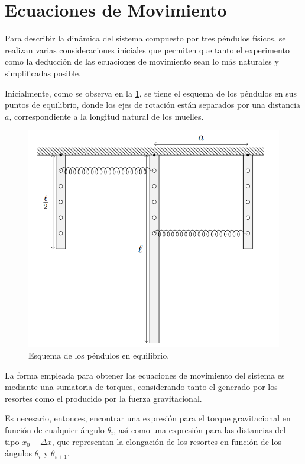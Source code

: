 \section{Ecuaciones de Movimiento}

Para describir la dinámica del sistema compuesto por tres péndulos físicos, se realizan varias consideraciones iniciales que permiten que tanto el experimento como la deducción de las ecuaciones de movimiento sean lo más naturales y simplificadas posible.

Inicialmente, como se observa en la \cref{fig:esquema_equilibrio}, se tiene el esquema de los péndulos en sus puntos de equilibrio, donde los ejes de rotación están separados por una distancia \( a \), correspondiente a la longitud natural de los muelles.

\begin{figure}[h]
    \centering
    \includegraphics[width=0.8\linewidth]{Figures/Screenshot From 2025-05-25 23-48-28.png}
    \caption{Esquema de los péndulos en equilibrio.}
    \label{fig:esquema_equilibrio}
\end{figure}

La forma empleada para obtener las ecuaciones de movimiento del sistema es mediante una sumatoria de torques, considerando tanto el generado por los resortes como el producido por la fuerza gravitacional.

Es necesario, entonces, encontrar una expresión para el torque gravitacional en función de cualquier ángulo \(\theta_i\), así como una expresión para las distancias del tipo \(x_0 + \Delta x\), que representan la elongación de los resortes en función de los ángulos \(\theta_i\) y \(\theta_{i\pm 1}\).

